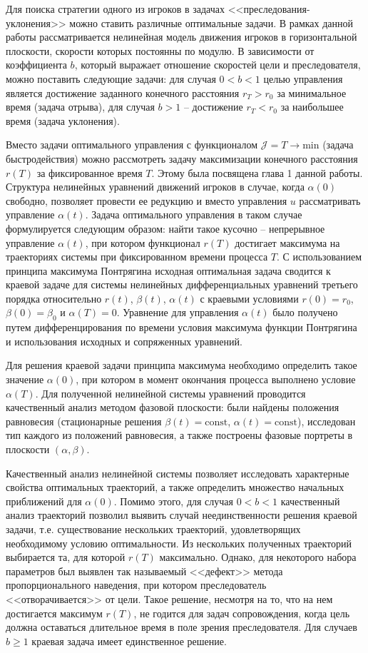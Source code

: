 \documentclass[a4paper,12pt, openany]{book}
\theoremstyle{plain} %
\theoremstyle{definition} %
\theoremstyle{remark} %
\numberwithin{equation}{chapter}
\begin{document}
{Для поиска стратегии одного из игроков в задачах <<преследования-уклонения>> можно ставить различные оптимальные задачи. В рамках данной работы рассматривается нелинейная модель движения игроков в горизонтальной плоскости, скорости которых постоянны по модулю. В зависимости от коэффициента $b$, который выражает отношение скоростей цели и преследователя, можно поставить следующие задачи: для  случая $0<b<1$ целью управления является достижение заданного конечного расстояния $r_T > r_0$ за минимальное время (задача отрыва), для случая $b>1$ -- достижение $r_T < r_0$ за наибольшее время (задача уклонения). 

Вместо задачи оптимального управления с функционалом $\mathcal{J} = T \longrightarrow \mathrm{min}$ (задача быстродействия) можно рассмотреть задачу максимизации конечного расстояния $r(T)$ за фиксированное время $T$. 
Этому была посвящена глава 1 данной работы. Структура нелинейных уравнений движений игроков в случае, когда $\alpha(0)$ свободно, позволяет провести ее редукцию и вместо управления $u$ рассматривать управление $\alpha(t)$. Задача оптимального управления в таком случае формулируется следующим образом: найти такое кусочно -- непрерывное управление $\alpha(t)$, при котором функционал $r(T)$ достигает максимума на траекториях системы при фиксированном времени процесса $T$. С использованием принципа максимума Понтрягина исходная оптимальная задача сводится к краевой задаче для системы нелинейных дифференциальных уравнений третьего порядка относительно $r(t)$, $\beta(t)$, $\alpha(t)$ с краевыми условиями $r(0) = r_0$, $\beta(0) = \beta _0$ и $\alpha(T) = 0$. Уравнение для управления $\alpha(t)$ было получено путем дифференцирования по времени условия максимума функции Понтрягина и использования исходных и сопряженных уравнений. 

Для решения краевой задачи принципа максимума необходимо определить такое значение $\alpha(0)$, при котором в момент окончания процесса выполнено условие $\alpha(T)$. Для полученной нелинейной системы уравнений проводится качественный анализ методом фазовой плоскости: были найдены положения равновесия (стационарные решения $\beta(t) = \mathrm{const}$, $\alpha(t) = \mathrm{const}$), исследован тип каждого из положений равновесия, а также построены фазовые портреты в плоскости $(\alpha,\beta)$. 

Качественный анализ нелинейной системы позволяет исследовать характерные свойства оптимальных траекторий, а также определить множество начальных приближений для $\alpha(0)$. Помимо этого, для случая $0<b<1$ качественный анализ траекторий позволил выявить случай неединственности решения краевой задачи, т.е. существование нескольких траекторий, удовлетворящих необходимому условию оптимальности. Из нескольких полученных траекторий выбирается та, для которой $r(T)$ максимально. Однако, для некоторого набора параметров был выявлен так называемый <<дефект>> метода пропорционального наведения, при котором преследователь <<отворачивается>> от цели. Такое решение, несмотря на то, что на нем достигается максимум $r(T)$, не годится для задач сопровождения, когда цель должна оставаться длительное время в поле зрения преследователя. Для случаев $b\geqslant 1$ краевая задача имеет единственное решение. 


}
\end{document}
